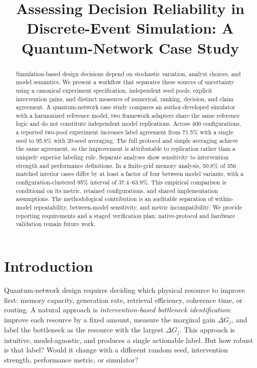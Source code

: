 \documentclass{ams-journal}
\title{Assessing Decision Reliability in Discrete-Event Simulation: A Quantum-Network Case Study}
\affiliation{\textsuperscript{1}Vesterlund Ventures, WestQuant Open}
\newcommand{\DG}{\Delta G}
\begin{document}
\maketitle

\begin{abstract}
Simulation-based design decisions depend on stochastic variation, analyst choices, and model semantics. We present a workflow that separates these sources of uncertainty using a canonical experiment specification, independent seed pools, explicit intervention gains, and distinct measures of numerical, ranking, decision, and claim agreement. A quantum-network case study compares an author-developed simulator with a harmonized reference model; two framework adapters share the same reference logic and do not constitute independent model replications. Across 400 configurations, a reported two-pool experiment increases label agreement from 71.5\% with a single seed to 95.8\% with 20-seed averaging. The full protocol and simple averaging achieve the same agreement, so the improvement is attributable to replication rather than a uniquely superior labeling rule. Separate analyses show sensitivity to intervention strength and performance definitions. In a finite-grid memory analysis, 50.8\% of 356 matched interior cases differ by at least a factor of four between model variants, with a configuration-clustered 95\% interval of 37.4--63.9\%. This empirical comparison is conditional on its metric, retained configurations, and shared implementation assumptions. The methodological contribution is an auditable separation of within-model repeatability, between-model sensitivity, and metric incompatibility. We provide reporting requirements and a staged verification plan; native-protocol and hardware validation remain future work.
\end{abstract}


\section{Introduction}
\label{sec:intro}

Quantum-network design requires deciding which physical resource to improve first: memory capacity, generation rate, retrieval efficiency, coherence time, or routing. A natural approach is \emph{intervention-based bottleneck identification}: improve each resource by a fixed amount, measure the marginal gain $\DG_j$, and label the bottleneck as the resource with the largest $\DG_j$. This approach is intuitive, model-agnostic, and produces a single actionable label. But how robust is that label? Would it change with a different random seed, intervention strength, performance metric, or simulator?
\end{document}
